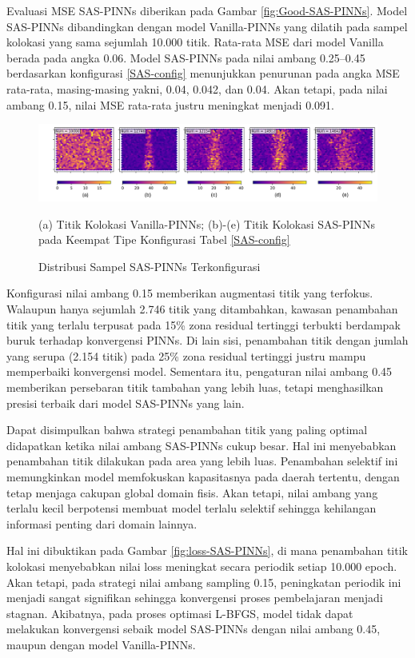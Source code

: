 Evaluasi MSE SAS-PINNs diberikan pada Gambar \ref{fig:Good-SAS-PINNs}. Model SAS-PINNs dibandingkan dengan model Vanilla-PINNs yang dilatih pada sampel kolokasi yang sama sejumlah 10.000 titik. Rata-rata MSE dari model Vanilla berada pada angka 0.06. Model SAS-PINNs pada nilai ambang 0.25--0.45 berdasarkan konfigurasi \ref{SAS-config} menunjukkan penurunan pada angka MSE rata-rata, masing-masing yakni, 0.04, 0.042, dan 0.04. Akan tetapi, pada nilai ambang 0.15, nilai MSE rata-rata justru meningkat menjadi 0.091.


\begin{figure}[htbp]
    \centering
    \includegraphics[width=1 \linewidth]{Gambar/colSMOTE.png}
    \caption{Distribusi Sampel SAS-PINNs Terkonfigurasi}
    (a) Titik Kolokasi Vanilla-PINNs; (b)-(e) Titik Kolokasi SAS-PINNs pada Keempat Tipe Konfigurasi Tabel \ref{SAS-config}
    \label{fig:col-SAS-PINNs}
\end{figure}

Konfigurasi nilai ambang 0.15 memberikan augmentasi titik yang terfokus. Walaupun hanya sejumlah 2.746 titik yang ditambahkan, kawasan penambahan titik yang terlalu terpusat pada 15\% zona residual tertinggi terbukti berdampak buruk terhadap konvergensi PINNs. Di lain sisi, penambahan titik dengan jumlah yang serupa (2.154 titik) pada 25\% zona residual tertinggi justru mampu memperbaiki konvergensi model. Sementara itu, pengaturan nilai ambang 0.45 memberikan persebaran titik tambahan yang lebih luas, tetapi menghasilkan presisi terbaik dari model SAS-PINNs yang lain. 

Dapat disimpulkan bahwa strategi penambahan titik yang paling optimal didapatkan ketika nilai ambang SAS-PINNs cukup besar. Hal ini menyebabkan penambahan titik dilakukan pada area yang lebih luas. Penambahan selektif ini memungkinkan model memfokuskan kapasitasnya pada daerah tertentu, dengan tetap menjaga cakupan global domain fisis. Akan tetapi, nilai ambang yang terlalu kecil berpotensi membuat model terlalu selektif sehingga kehilangan informasi penting dari domain lainnya. 

Hal ini dibuktikan pada Gambar \ref{fig:loss-SAS-PINNs}, di mana penambahan titik kolokasi menyebabkan nilai loss meningkat secara periodik setiap 10.000 epoch. Akan tetapi, pada strategi nilai ambang sampling 0.15, peningkatan periodik ini menjadi sangat signifikan sehingga konvergensi proses pembelajaran menjadi stagnan. Akibatnya, pada proses optimasi L-BFGS, model tidak dapat melakukan konvergensi sebaik model SAS-PINNs dengan nilai ambang 0.45, maupun dengan model Vanilla-PINNs.

